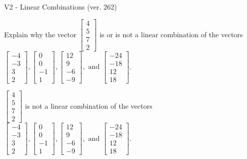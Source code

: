 \begin{exercise}
  \begin{exerciseTitle}V2 - Linear Combinations (ver. 262)\end{exerciseTitle}
  \begin{exerciseStatement}
    Explain why the vector \(\left[\begin{array}{c}
4 \\
5 \\
7 \\
2
\end{array}\right]\)  is or is not a linear 
	combination of the vectors \(\left[\begin{array}{c}
-4 \\
-3 \\
3 \\
2
\end{array}\right] , \left[\begin{array}{c}
0 \\
0 \\
-1 \\
1
\end{array}\right] , \left[\begin{array}{c}
12 \\
9 \\
-6 \\
-9
\end{array}\right] , \text{ and } \left[\begin{array}{c}
-24 \\
-18 \\
12 \\
18
\end{array}\right]\).
	


  \end{exerciseStatement}
  \begin{exerciseAnswer}
   \(\left[\begin{array}{c}
4 \\
5 \\
7 \\
2
\end{array}\right]\) 
  	 is not  
	a linear combination of the vectors \(\left[\begin{array}{c}
-4 \\
-3 \\
3 \\
2
\end{array}\right] , \left[\begin{array}{c}
0 \\
0 \\
-1 \\
1
\end{array}\right] , \left[\begin{array}{c}
12 \\
9 \\
-6 \\
-9
\end{array}\right] , \text{ and } \left[\begin{array}{c}
-24 \\
-18 \\
12 \\
18
\end{array}\right]\).


\end{exerciseAnswer}
\end{exercise}
